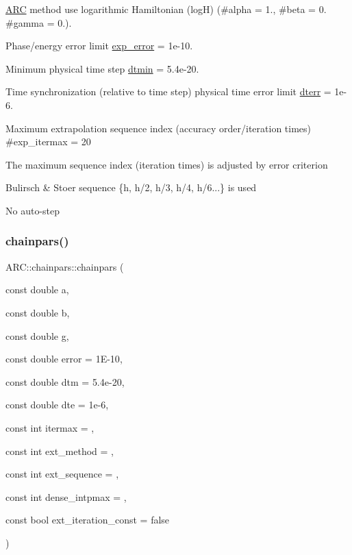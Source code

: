 \begin{DoxyItemize}
\item \hyperlink{namespaceARC}{A\+RC} method use logarithmic Hamiltonian (logH) (\#alpha = 1., \#beta = 0. \#gamma = 0.).
\item Phase/energy error limit \hyperlink{classARC_1_1chainpars_a7ee477ebe8b1d67457891ab58560c074}{exp\+\_\+error} = 1e-\/10.
\item Minimum physical time step \hyperlink{classARC_1_1chainpars_ac414014d19915aecb35245ba11649c2e}{dtmin} = 5.\+4e-\/20.
\item Time synchronization (relative to time step) physical time error limit \hyperlink{classARC_1_1chainpars_ad3a3e8f9199180ec82b9c257b1e8570e}{dterr} = 1e-\/6.
\item Maximum extrapolation sequence index (accuracy order/iteration times) \#exp\+\_\+itermax = 20
\item The maximum sequence index (iteration times) is adjusted by error criterion
\item Bulirsch \& Stoer sequence \{h, h/2, h/3, h/4, h/6...\} is used
\item No auto-\/step 
\end{DoxyItemize}\hypertarget{classARC_1_1chainpars_aa41e5cf2a9a8dea2c9c097cfd08d6120}{}\label{classARC_1_1chainpars_aa41e5cf2a9a8dea2c9c097cfd08d6120} 
\subsubsection{\texorpdfstring{chainpars()}{chainpars()}\hspace{0.1cm}{\footnotesize\ttfamily [2/2]}}
{\footnotesize\ttfamily A\+R\+C\+::chainpars\+::chainpars (\begin{DoxyParamCaption}\item[{const double}]{a,  }\item[{const double}]{b,  }\item[{const double}]{g,  }\item[{const double}]{error = {\ttfamily 1E-\/10},  }\item[{const double}]{dtm = {\ttfamily 5.4e-\/20},  }\item[{const double}]{dte = {\ttfamily 1e-\/6},  }\item[{const int}]{itermax = {},  }\item[{const int}]{ext\+\_\+method = {},  }\item[{const int}]{ext\+\_\+sequence = {},  }\item[{const int}]{dense\+\_\+intpmax = {},  }\item[{const bool}]{ext\+\_\+iteration\+\_\+const = {\ttfamily false} }\end{DoxyParamCaption})\hspace{0.3cm}{\ttfamily [inline]}}




